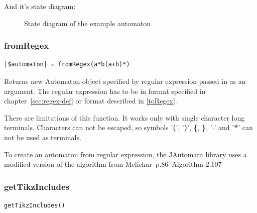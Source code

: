 \documentclass{ctuthesis}
\begin{document}
And it's state diagram:
\begin{figure}[H]
\caption{State diagram of the example automaton}
\label{fig:example_automaton_diagram}
\end{figure}

\subsubsection{fromRegex}
\label{fromRegex}
\begin{lstlisting}[language = JASL_snippet]
	|$automaton| = fromRegex(a*b(a+b)*)
\end{lstlisting}

Returns new Automaton object specified by regular expression passed in as an argument. The regular expression has to be in format specified in chapter~\ref{sec:regex-def} or format described in \ref{toRegex}.

There are limitations of this function. It works only with single character long terminals. Characters can not be escaped, so symbols '\textbf{(}', '\textbf{)}', \textbf{\{}, \textbf{\}}, '$\mathbf{\cdot}$' and '\textbf{*}' can not be used as terminals. 

To create an automaton from regular expression, the JAutomata library uses a modified version of the algorithm from Melichar~p.86~Algorithm 2.107~\cite{melichar}

\subsubsection{getTikzIncludes}
\label{subsec:getTikzIncludes}
\begin{lstlisting}[language = JASL_snippet]
	getTikzIncludes()
\end{lstlisting}
\end{document}

